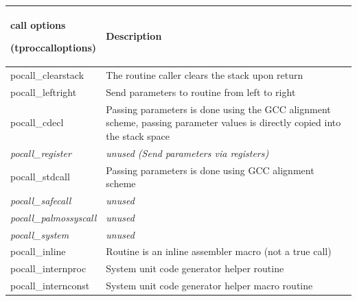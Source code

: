 \documentclass [12pt]{article}
\begin{document}
\begin{longtable}{|l|p{10cm}|}
\hline
call options \par (tproccalloptions) & Description \\
\hline
\endhead
\hline
\endfoot
\textsf{pocall{\_}clearstack}& 
	The routine caller clears the stack upon return \\
\textsf{pocall{\_}leftright}& 
	Send parameters to routine from left to right \\
\textsf{pocall{\_}cdecl}& 
	Passing parameters is done using the GCC alignment scheme, passing
	parameter values is directly copied into the stack space \\
\textsf{\textit{pocall{\_}register}}& 
	\textit{unused (Send parameters via registers)} \\
\textsf{pocall{\_}stdcall}& 
	Passing parameters is done using GCC alignment scheme \\
\textsf{\textit{pocall{\_}safecall}}& 
	\textit{unused} \\
\textsf{\textit{pocall{\_}palmossyscall}}& 
	\textit{unused} \\
\textsf{\textit{pocall{\_}system}}& 
	\textit{unused} \\
\textsf{pocall{\_}inline}& 
	Routine is an inline assembler macro (not a true call) \\
\textsf{pocall{\_}internproc}& 
	System unit code generator helper routine \\
\textsf{pocall{\_}internconst}& 
	System unit code generator helper macro routine \\
\end{longtable}
\end{document}
